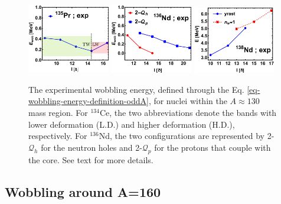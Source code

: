 \begin{figure}
    \includegraphics[width=0.32\textwidth]{Chapters/Figures/wobblers/135Pr-edited.pdf}
    \includegraphics[width=0.32\textwidth]{Chapters/Figures/wobblers/136Nd-joint.pdf}
    \includegraphics[width=0.32\textwidth]{Chapters/Figures/wobblers/138Nd.pdf}
    \caption{The experimental wobbling energy, defined through the Eq. \ref{eq-wobbling-energy-definition-oddA}, for nuclei within the $A\approx 130$ mass region. For $^{134}$Ce, the two abbreviations denote the bands with lower deformation (L.D.) and higher deformation (H.D.), respectively. For $^{136}$Nd, the two configurations are represented by 2-$\mathcal{Q}_h$ for the neutron holes and 2-$\mathcal{Q}_p$ for the protons that couple with the core. See text for more details.}
    \label{wobblers-exp-set2}
\end{figure}

\subsection{Wobbling around A=160}


